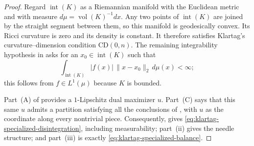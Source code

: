 \documentclass[11pt]{article}
\theoremstyle{definition}
\theoremstyle{remark}
\newcommand{\vol}{\operatorname{vol}}
\begin{document}
\begin{proof}
Regard ${\operatorname{int}(K)}$ as a Riemannian manifold with the Euclidean metric and with
measure $d\mu=\vol(K)^{-1}dx$.  Any two points of ${\operatorname{int}(K)}$ are joined by
the straight segment between them, so this manifold is geodesically convex.
Its Ricci curvature is zero and its density is constant.  It therefore
satisfies Klartag's curvature--dimension condition $\mathrm{CD}(0,n)$.
The remaining integrability hypothesis in \cite[Theorem~1.5]{KlartagNeedles} asks for an
$x_0\in{\operatorname{int}(K)}$ such that
\[
 \int_{\operatorname{int}(K)} |f(x)|\,\|x-x_0\|_2\,d\mu(x)<\infty;
\]
this follows from $f\in L^1(\mu)$ because $K$ is bounded.

Part~\textup{(A)} of \cite[Theorem~1.5]{KlartagNeedles} provides a
$1$-Lipschitz dual maximizer $u$.  Part~\textup{(C)} says that this same
$u$ admits a partition satisfying all the conclusions of \cite[Theorem~1.2]{KlartagNeedles}, with $u$ as the coordinate along every nontrivial piece.  Consequently,
\cite[Theorem~1.2~\textup{(i)}]{KlartagNeedles} gives
\eqref{eq:klartag-specialized-disintegration}, including measurability;
part~\textup{(ii)} gives the needle structure; and part~\textup{(iii)} is
exactly \eqref{eq:klartag-specialized-balance}.


\end{proof}
\end{document}
